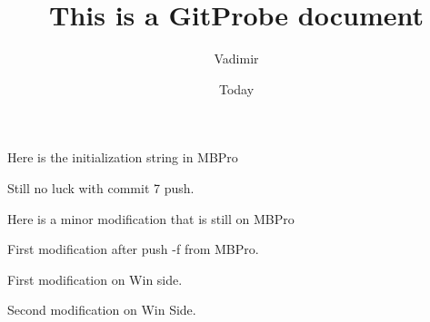 \documentclass[]{article}
\begin{document}
\title{This is a GitProbe document}
\author{Vadimir}
\date{Today}
\maketitle

Here is the initialization string in MBPro

Still no luck with commit 7 push.

Here is a minor modification that is still on MBPro

First modification after push -f  from MBPro.

First modification on Win side.

Second modification on Win Side.
\end{document}
